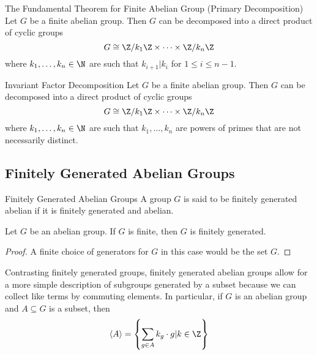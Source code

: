 \documentclass[a4paper]{article}
\begin{document}
\begin{thm}{The Fundamental Theorem for Finite Abelian Group (Primary Decomposition)}{} Let $G$ be a finite abelian group. Then $G$ can be decomposed into a direct product of cyclic groups $$G\cong\Z/k_1\Z\times\dots\times\Z/k_n\Z$$ where $k_1,\dots,k_n\in\N$ are such that $k_{i+1}|k_i$ for $1\leq i\leq n-1$. 
\end{thm}

\begin{thm}{Invariant Factor Decomposition}{} Let $G$ be a finite abelian group. Then $G$ can be decomposed into a direct product of cyclic groups $$G\cong\Z/k_1\Z\times\dots\times\Z/k_n\Z$$ where $k_1,\dots,k_n\in\N$ are such that $k_1,\dots,k_n$ are powers of primes that are not necessarily distinct. 
\end{thm}

\subsection{Finitely Generated Abelian Groups}
\begin{defn}{Finitely Generated Abelian Groups}{} A group $G$ is said to be finitely generated abelian if it is finitely generated and abelian. 
\end{defn}

\begin{lmm}{}{} Let $G$ be an abelian group. If $G$ is finite, then $G$ is finitely generated. \tcbline
\begin{proof}
A finite choice of generators for $G$ in this case would be the set $G$. 
\end{proof}
\end{lmm}

Contrasting finitely generated groups, finitely generated abelian groups allow for a more simple description of subgroups generated by a subset because we can collect like terms by commuting elements. In particular, if $G$ is an abelian group and $A\subseteq G$ is a subset, then $$\langle A\rangle=\left\{\sum_{g\in A}k_g\cdot g|k\in\Z\right\}$$
\end{document}
